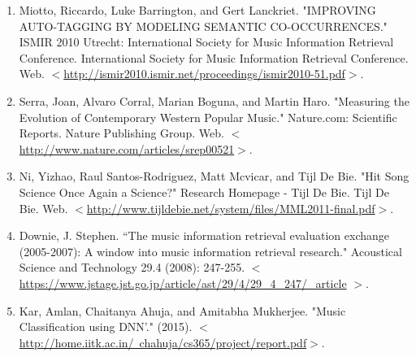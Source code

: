 \documentclass[12pt]{article}
\begin{document}
\begin{enumerate}
    \item Miotto, Riccardo, Luke Barrington, and Gert Lanckriet. "IMPROVING AUTO-TAGGING BY MODELING SEMANTIC CO-OCCURRENCES." ISMIR 2010 Utrecht: International Society for Music Information Retrieval Conference. International Society for Music Information Retrieval Conference. Web. $<$\href{http://ismir2010.ismir.net/proceedings/ismir2010-51.pdf}{http://ismir2010.ismir.net/proceedings/ismir2010-51.pdf}$>$.\vspace{-1ex}
    
    \item Serra, Joan, Alvaro Corral, Marian Boguna, and Martin Haro. "Measuring the Evolution of Contemporary Western Popular Music." Nature.com: Scientific Reports. Nature Publishing Group. Web. $<$\href{http://www.nature.com/articles/srep00521}{http://www.nature.com/articles/srep00521}$>$.\vspace{-1ex}
    
    \item Ni, Yizhao, Raul Santos-Rodriguez, Matt Mcvicar, and Tijl De Bie. "Hit Song Science Once Again a Science?" Research Homepage - Tijl De Bie. Tijl De Bie. Web. $<$\href{http://www.tijldebie.net/system/files/MML2011-final.pdf}{http://www.tijldebie.net/system/files/MML2011-final.pdf}$>$.
    \vspace{-1ex}
     
    \item Downie, J. Stephen. ``The music information retrieval evaluation exchange (2005-2007): A window into music information retrieval research." Acoustical Science and Technology 29.4 (2008): 247-255. $<$ \href{https://www.jstage.jst.go.jp/article/ast/29/4/29\_4\_247/\_article}{https://www.jstage.jst.go.jp/article/ast/29/4/29\_4\_247/\_article} $>$. 
    \vspace{-1ex}
    
    \item Kar, Amlan, Chaitanya Ahuja, and Amitabha Mukherjee. "Music Classification using DNN'." (2015). $<$\href{http://home.iitk.ac.in/~chahuja/cs365/project/report.pdf}{http://home.iitk.ac.in/~chahuja/cs365/project/report.pdf}$>$.

   
\end{enumerate}
\end{document}
